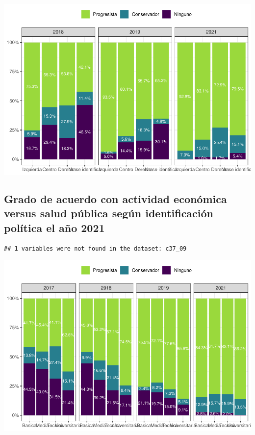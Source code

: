 \documentclass[
  12pt,
]{book}
\begin{document}
\begin{center}\includegraphics{reporte-elsoc_files/figure-latex/unnamed-chunk-10-1} \end{center}

\hypertarget{grado-de-acuerdo-con-actividad-econuxf3mica-versus-salud-puxfablica-seguxfan-identificaciuxf3n-poluxedtica-el-auxf1o-2021}{%
\subsection{Grado de acuerdo con actividad económica versus salud pública según identificación política el año 2021}\label{grado-de-acuerdo-con-actividad-econuxf3mica-versus-salud-puxfablica-seguxfan-identificaciuxf3n-poluxedtica-el-auxf1o-2021}}

\begin{verbatim}
## 1 variables were not found in the dataset: c37_09
\end{verbatim}

\begin{center}\includegraphics{reporte-elsoc_files/figure-latex/unnamed-chunk-11-1} \end{center}
\end{document}

